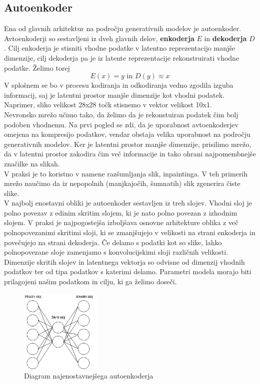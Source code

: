 \documentclass[12pt,a4paper,twoside]{article}
\theoremstyle{definition} %
\theoremstyle{plain} %
\numberwithin{equation}{section}  %
\begin{document}
\subsection{Autoenkoder}
Ena od glavnih arhitektur na področju generativnih modelov je autoenkoder. Avtoenkoderji so sestavljeni iz dveh glavnih delov, \textbf{enkoderja} $E$ in \textbf{dekoderja} $D$. 
Cilj enkoderja je stisniti vhodne podatke v latentno reprezentacijo manjše dimenzije, cilj dekoderja pa je iz latente reprezentacije rekonstruirati vhodne podatke. 
Želimo torej $$ E(x) = y \text{ in } D(y) \approx x $$ 
V splošnem se bo v procesu kodiranja in odkodiranja vedno zgodila izguba informacij, saj je latentni prostor manjše dimenzije kot vhodni podatek. Naprimer, sliko velikost 28x28 točk stisnemo v vektor velikost 10x1. 
\\
Nevronsko mrežo učimo tako, da želimo da je rekonstuiran podatek čim bolj podoben vhodnemu. Na prvi pogled se zdi, da je uporabnost avtoenkoderjev omejena na kompresijo podatkov, vendar obstaja velika uporabnost na področju generativnih modelov. 
Ker je latentni prostor manjše dimenzije, prisilimo mrežo, da v latentni prostor zakodira čim več informacije in tako ohrani najpomembnejše značilke na slikah. \\
V praksi je to koristno v namene razšumljanja slik, inpaintinga. V teh primerih mrežo naučimo da iz nepopolnih (manjkajočih, šumnatih) slik zgenerira čiste slike. 
\\
V najbolj enostavni obliki je autoenkoder sestavljen iz treh slojev. Vhodni sloj je polno povezav z edinim skritim slojem, ki je nato polno povezan z izhodnim slojem. 
V praksi je najpogostejša izboljšava osnovne arhitekture  oblika z več polnopovezanimi skritimi sloji, ki se zmanjšujejo v velikosti na strani enkoderja in povečujejo na strani dekoderja. 
Če delamo s podatki kot so slike, lahko polnopovezane sloje zamenjamo s konvolucijskimi sloji različnih velikosti. 
\\
Dimenzije skritih slojev in latentnega vektorja so odvisne od dimenzij vhodnih podatkov ter od tipa podatkov s katerimi delamo. Parametri modela morajo biti prilagojeni našim podatkom in cilju, ki ga želimo doseči. 

\begin{figure}[ht]
  \centering
  \includegraphics[width=0.35\textwidth]{images/autoencoder.png}
 \caption[Diagram najenostavnejšega autoenkoderja]{Diagram najenostavnejšega autoenkoderja}
  \label{fig:autoencoder-diagram}
\end{figure}
\end{document}
